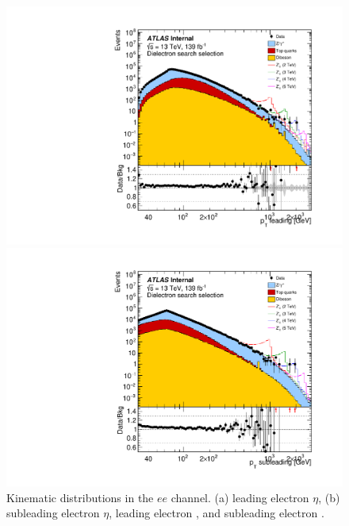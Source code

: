 \begin{figure}[h!]
\begin{minipage}[b]{.45\linewidth}
    \includegraphics[width=1\textwidth]{figures/ci/dataMc/stacks_mc16e_2015-2018_ee_pt1_log100.pdf}
    \subcaption{}
\end{minipage}
\begin{minipage}[b]{.45\linewidth}
    \includegraphics[width=1\textwidth]{figures/ci/dataMc/stacks_mc16e_2015-2018_ee_pt2_log100.pdf}
    \subcaption{}
\end{minipage}
\caption{Kinematic distributions in the $ee$ channel. (a) leading electron $\eta$, (b) subleading electron $\eta$, leading electron \pt, and subleading electron \pt.}
\label{fig:}
\end{figure}

